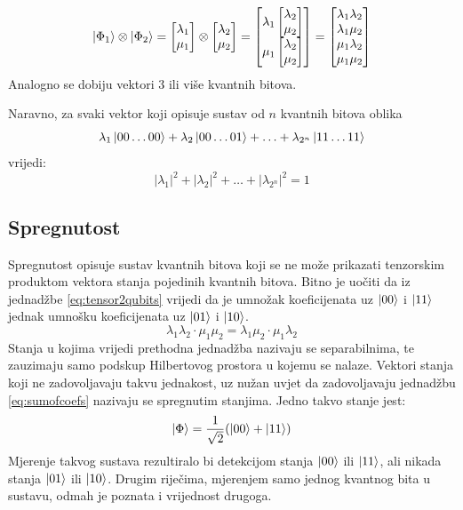 \[
\ket{\Phi_1} \otimes \ket{\Phi_2} =
\begin{bmatrix}
\lambda_1 \\ \mu_1
\end{bmatrix}
\otimes
\begin{bmatrix}
\lambda_2 \\ \mu_2
\end{bmatrix}
=
\begin{bmatrix}
\lambda_1
	\begin{bmatrix}
	\lambda_2 \\ \mu_2
	\end{bmatrix} \\
\mu_1
	\begin{bmatrix}
	\lambda_2 \\ \mu_2
	\end{bmatrix}
\end{bmatrix}
=
\begin{bmatrix}
\lambda_1\lambda_2 \\
\lambda_1\mu_2 \\
\mu_1\lambda_2 \\
\mu_1\mu_2 \\
\end{bmatrix}
\]
Analogno se dobiju vektori 3 ili više kvantnih bitova.

Naravno, za svaki vektor koji opisuje sustav od $n$ kvantnih bitova oblika
\[\lambda_1\ket{00 \ldots 00} + \lambda_2\ket{00 \ldots 01} + \ldots + \lambda_{2^n}\ket{11 \ldots 11}
\]
vrijedi:
\begin{equation}
|\lambda_1|^2 + |\lambda_2|^2 + \ldots + |\lambda_{2^n}|^2 = 1
\label{eq:sumofcoefs}
\end{equation}

\subsection{Spregnutost}

Spregnutost  opisuje sustav kvantnih bitova koji se ne može prikazati tenzorskim produktom vektora stanja pojedinih kvantnih bitova. Bitno je uočiti da iz jednadžbe \ref{eq:tensor2qubits} vrijedi da je umnožak koeficijenata uz $\ket{00}$ i $\ket{11}$ jednak umnošku koeficijenata uz $\ket{01}$ i $\ket{10}$.
\[
\lambda_1\lambda_2 \cdot \mu_1\mu_2 = \lambda_1\mu_2 \cdot \mu_1\lambda_2
\]
Stanja u kojima vrijedi prethodna jednadžba nazivaju se separabilnima, te zauzimaju samo podskup Hilbertovog prostora u kojemu se nalaze. Vektori stanja koji ne zadovoljavaju takvu jednakost, uz nužan uvjet da zadovoljavaju jednadžbu \ref{eq:sumofcoefs} nazivaju se spregnutim stanjima. Jedno takvo stanje jest:
\[
\ket{\Phi} = \frac{1}{\sqrt{2}}(\ket{00} + \ket{11})
\]
Mjerenje takvog sustava rezultiralo bi detekcijom stanja $\ket{00}$ ili $\ket{11}$, ali nikada  stanja $\ket{01}$ ili $\ket{10}$. Drugim riječima, mjerenjem samo jednog kvantnog bita u sustavu, odmah je poznata i vrijednost drugoga.

